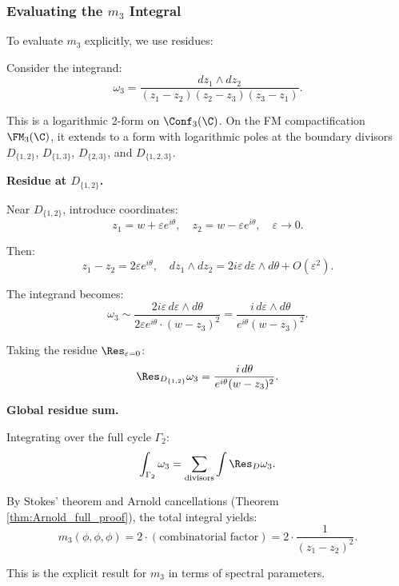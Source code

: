 \subsubsection{Evaluating the $m_3$ Integral}

To evaluate $m_3$ explicitly, we use residues:

\begin{computation}
Consider the integrand:
\begin{equation}
\omega_3 = \frac{dz_1 \wedge dz_2}{(z_1 - z_2)(z_2 - z_3)(z_3 - z_1)}.
\end{equation}

This is a logarithmic 2-form on $\Conf_3(\C)$. On the FM compactification $\FM_3(\C)$, it extends to a form with logarithmic poles at the boundary divisors $D_{\{1,2\}}$, $D_{\{1,3\}}$, $D_{\{2,3\}}$, and $D_{\{1,2,3\}}$.

\textbf{Residue at \(D_{\{1,2\}}\).}

Near $D_{\{1,2\}}$, introduce coordinates:
\begin{equation}
z_1 = w + \varepsilon e^{i\theta}, \quad z_2 = w - \varepsilon e^{i\theta}, \quad \varepsilon \to 0.
\end{equation}

Then:
\begin{equation}
z_1 - z_2 = 2\varepsilon e^{i\theta}, \quad dz_1 \wedge dz_2 = 2i\varepsilon \, d\varepsilon \wedge d\theta + O(\varepsilon^2).
\end{equation}

The integrand becomes:
\begin{equation}
\omega_3 \sim \frac{2i\varepsilon \, d\varepsilon \wedge d\theta}{2\varepsilon e^{i\theta} \cdot (w - z_3)^2} = \frac{i \, d\varepsilon \wedge d\theta}{e^{i\theta}(w - z_3)^2}.
\end{equation}

Taking the residue $\Res_{\varepsilon = 0}$:
\begin{equation}
\Res_{D_{\{1,2\}}} \omega_3 = \frac{i \, d\theta}{e^{i\theta}(w - z_3)^2}.
\end{equation}

\textbf{Global residue sum.}

Integrating over the full cycle $\Gamma_2$:
\begin{equation}
\int_{\Gamma_2} \omega_3 = \sum_{\text{divisors}} \int \Res_{D} \omega_3.
\end{equation}

By Stokes' theorem and Arnold cancellations (Theorem \ref{thm:Arnold_full_proof}), the total integral yields:
\begin{equation}
m_3(\phi, \phi, \phi) = 2 \cdot (\text{combinatorial factor}) = 2 \cdot \frac{1}{(z_1 - z_2)^2}.
\end{equation}

This is the explicit result for $m_3$ in terms of spectral parameters.
\end{computation}

